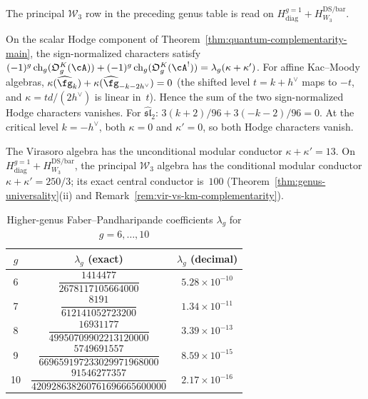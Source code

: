 \noindent
The principal $\mathcal W_3$ row in the preceding genus table is read
on $H_{\mathrm{diag}}^{g=1}+H_{W_3}^{\mathrm{DS/bar}}$.

\begin{remark}\label{rem:genus-complementarity}
On the scalar Hodge component of Theorem~\ref{thm:quantum-complementarity-main},
the sign-normalized characters satisfy
$(-1)^g\operatorname{ch}_g(\mathfrak O_g^K(\cA))
+(-1)^g\operatorname{ch}_g(\mathfrak O_g^K(\cA^!))
=\lambda_g(\kappa+\kappa')$.
For affine Kac--Moody algebras,
$\kappa(\widehat{\fg}_k) + \kappa(\widehat{\fg}_{-k-2h^\vee}) = 0$
(the shifted level $t = k + h^\vee$ maps to $-t$, and
$\kappa = td/(2h^\vee)$ is linear in~$t$).
Hence the sum of the two sign-normalized Hodge characters vanishes.
For $\widehat{\mathfrak{sl}}_2$:
$3(k{+}2)/96 + 3(-k{-}2)/96 = 0$.
At the critical level $k = -h^\vee$, both $\kappa = 0$ and $\kappa' = 0$,
so both Hodge characters vanish.

The Virasoro algebra has the unconditional modular conductor
$\kappa+\kappa'=13$.  On
$H_{\mathrm{diag}}^{g=1}+H_{W_3}^{\mathrm{DS/bar}}$, the principal
$\mathcal W_3$ algebra has the conditional modular conductor
$\kappa+\kappa'=250/3$; its exact central conductor is~$100$
\textup{(}Theorem~\ref{thm:genus-universality}(ii) and
Remark~\ref{rem:vir-vs-km-complementarity}\textup{)}.
\end{remark}

\begin{table}[ht]
\centering
\caption{Higher-genus Faber--Pandharipande coefficients $\lambda_g$ for $g = 6, \ldots, 10$}
\label{tab:genus-obstructions-high}
\renewcommand{\arraystretch}{1.5}
{\footnotesize
\begin{tabular}{|c|c|c|}
\hline
$g$ & $\lambda_g$ (exact) & $\lambda_g$ (decimal) \\
\hline
6 & $\dfrac{1414477}{2678117105664000}$ & $5.28 \times 10^{-10}$ \\[6pt]
\hline
7 & $\dfrac{8191}{612141052723200}$ & $1.34 \times 10^{-11}$ \\[6pt]
\hline
8 & $\dfrac{16931177}{49950709902213120000}$ & $3.39 \times 10^{-13}$ \\[6pt]
\hline
9 & $\dfrac{5749691557}{669659197233029971968000}$ & $8.59 \times 10^{-15}$ \\[6pt]
\hline
10 & $\dfrac{91546277357}{420928638260761696665600000}$ & $2.17 \times 10^{-16}$ \\[6pt]
\hline
\end{tabular}
}
\end{table}

